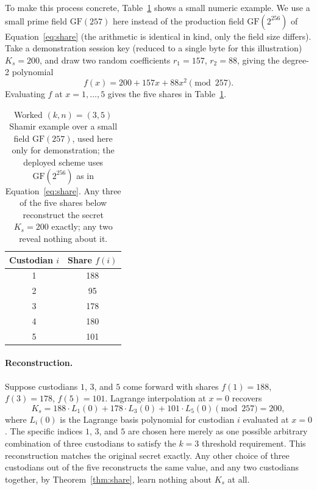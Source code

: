 \documentclass[pdflatex,sn-mathphys-num]{sn-jnl}%
\theoremstyle{thmstyleone}%
\theoremstyle{thmstyletwo}%
\theoremstyle{thmstylethree}%
\begin{document}
To make this process concrete, Table~\ref{tab:shamir} shows a small
numeric example. We use a small prime field $\mathrm{GF}(257)$ here instead of the production field $\mathrm{GF}(2^{256})$ of
Equation~\eqref{eq:share} (the arithmetic is identical in kind, only the
field size differs). Take a demonstration session key (reduced to a single
byte for this illustration) $K_s=200$, and draw two random coefficients
$r_1=157$, $r_2=88$, giving the degree-2 polynomial
\[
f(x) = 200 + 157x + 88x^2 \pmod{257}.
\]
Evaluating $f$ at $x=1,\dots,5$ gives the five shares in Table~\ref{tab:shamir}.

\begin{table}[htbp]
\centering
\caption{Worked $(k,n)=(3,5)$ Shamir example over a small field $\mathrm{GF}(257)$,
used here only for demonstration; the deployed scheme uses $\mathrm{GF}(2^{256})$ as in
Equation~\eqref{eq:share}. Any three of the five shares below reconstruct the
secret $K_s=200$ exactly; any two reveal nothing about it.}
\label{tab:shamir}
\small
\begin{tabular}{cc}
\toprule
\textbf{Custodian $i$} & \textbf{Share $f(i)$} \\
\midrule
1 & 188 \\
2 & 95 \\
3 & 178 \\
4 & 180 \\
5 & 101 \\
\bottomrule
\end{tabular}
\end{table}

\paragraph{Reconstruction.} Suppose custodians $1$, $3$, and $5$ come forward
with shares $f(1)=188$, $f(3)=178$, $f(5)=101$. Lagrange interpolation at
$x=0$ recovers
\[
K_s = 188\cdot L_1(0) + 178\cdot L_3(0) + 101\cdot L_5(0) \pmod{257} = 200,
\]
where $L_i(0)$ is the Lagrange basis polynomial for custodian $i$ evaluated at $x=0$. The specific indices $1$, $3$, and $5$ are chosen here merely as one possible arbitrary combination of three custodians to satisfy the $k=3$ threshold requirement. This reconstruction matches the original secret exactly. Any other choice of three custodians out of the five reconstructs the same value, and any two custodians together, by Theorem~\ref{thm:share}, learn nothing about $K_s$ at all.
\end{document}
